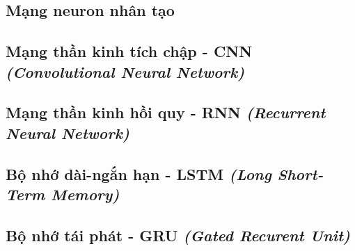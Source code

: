 \subsection{Mạng neuron nhân tạo}


\subsection{Mạng thần kinh tích chập - CNN \textit{(Convolutional Neural Network)}}


\subsection{Mạng thần kinh hồi quy - RNN \textit{(Recurrent Neural Network)}}


\subsection{Bộ nhớ dài-ngắn hạn - LSTM \textit{(Long Short-Term Memory)}}


\subsection{Bộ nhớ tái phát - GRU \textit{(Gated Recurent Unit)}}


% 